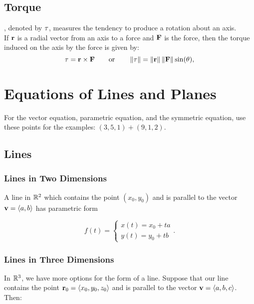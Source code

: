 \subsection{Torque}

, denoted by \(\mathbf{\tau}\), measures the tendency to produce a rotation about an axis. \\

If \(\mathbf{r}\) is a radial vector from an axis to a force and \(\mathbf{F}\) is the force, then the torque induced on the axis by the force is given by:
\[
    \mathbf{\tau} = \mathbf{r} \times \mathbf{F} \qquad \text{or} \qquad \left\lVert \mathbf{\mathbf{\tau}}\right\rVert = \left\lVert \mathbf{r}\right\rVert\left\lVert \mathbf{F}\right\rVert\sin(\theta),
\]


\newpage

\section{Equations of Lines and Planes}

For the vector equation, parametric equation, and the symmetric equation, use these points for the examples: \((3,5,1) + (9,1,2)\).

\subsection{Lines}

\subsubsection{Lines in Two Dimensions}

A line in \(\mathbb{R}^{2}\) which contains the point \((x_{0},y_{0})\) and is parallel to the vector \(\mathbf{v} = \langle a,b \rangle\) has parametric form

\[
    f(t) = \begin{cases}
        x(t) = x_{0} + ta \\
        y(t) = y_{0} + tb
    \end{cases}.
\]

\subsubsection{Lines in Three Dimensions}

In \(\mathbb{R}^{3}\), we have more options for the form of a line. Suppose that our line contains the point \(\mathbf{r}_{0} = \langle x_{0},y_{0},z_{0} \rangle\) and is parallel to the vector \(\mathbf{v} = \langle a,b,c \rangle\). Then:

